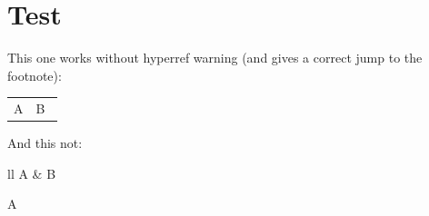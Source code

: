 \documentclass{article}
\begin{document}
\section{Test}

\noindent This one works without hyperref warning (and gives a correct jump to the footnote):
\begin{longtable}{ll}
A & B~\footnotemark\\
\end{longtable}

\noindent And this not:
\begin{longtable*}{ll}
A & B~\footnotemark\\
\end{longtable*}

\clearpage
A
\end{document}
